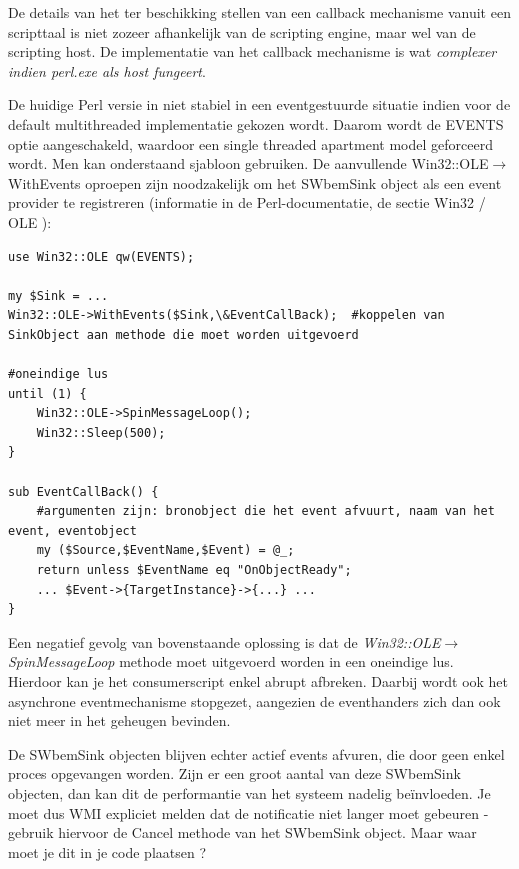 \documentclass[11pt,a4paper]{report}
\begin{document}
De details van het ter beschikking stellen van een callback mechanisme vanuit een scripttaal is niet zozeer afhankelijk van de scripting engine, maar wel van de scripting host. De implementatie van het callback mechanisme is wat \textit{complexer indien perl.exe als host fungeert}.
\par De huidige Perl versie in niet stabiel in een eventgestuurde situatie indien voor de default multithreaded implementatie gekozen wordt. Daarom wordt de EVENTS optie aangeschakeld, waardoor een single threaded apartment model geforceerd wordt.
Men kan onderstaand sjabloon gebruiken. De aanvullende Win32::OLE$\rightarrow$WithEvents oproepen zijn noodzakelijk om het SWbemSink object als een event provider te registreren (informatie in de Perl-documentatie, de sectie Win32 / OLE ):
\begin{lstlisting}
use Win32::OLE qw(EVENTS);

my $Sink = ...
Win32::OLE->WithEvents($Sink,\&EventCallBack);  #koppelen van SinkObject aan methode die moet worden uitgevoerd

#oneindige lus
until (1) {
	Win32::OLE->SpinMessageLoop();
	Win32::Sleep(500);
}

sub EventCallBack() {
	#argumenten zijn: bronobject die het event afvuurt, naam van het event, eventobject
	my ($Source,$EventName,$Event) = @_;
	return unless $EventName eq "OnObjectReady";
	... $Event->{TargetInstance}->{...} ...
}
\end{lstlisting}
Een negatief gevolg van bovenstaande oplossing is dat de \textit{Win32::OLE$\rightarrow$SpinMessageLoop} methode moet uitgevoerd worden in een oneindige lus. Hierdoor kan je het consumerscript enkel abrupt afbreken. Daarbij wordt ook het asynchrone eventmechanisme stopgezet, aangezien de eventhanders zich dan ook niet meer in het geheugen bevinden. \par De SWbemSink objecten blijven echter actief events afvuren, die door geen enkel proces opgevangen worden. Zijn er een groot aantal van deze SWbemSink objecten, dan kan dit de performantie van het systeem nadelig beïnvloeden.
Je moet dus WMI expliciet melden dat de notificatie niet langer moet gebeuren - gebruik hiervoor de Cancel methode van het SWbemSink object. Maar waar moet je dit in je code plaatsen ?
\end{document}
